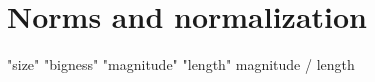 %
%
%
%
%
%
%
%
%
%
%
%
%
%
%
%
%
%
%
%
%
%
%
%
%
%
%
%
%
%
%
%
%
%
%
%
%
%
%
%
%


%
%
%
%
%
%
%
%
%
%
%


\section{Norms and normalization}
\label{sec:norms}

    "size" "bigness" "magnitude" "length"
    magnitude / length



